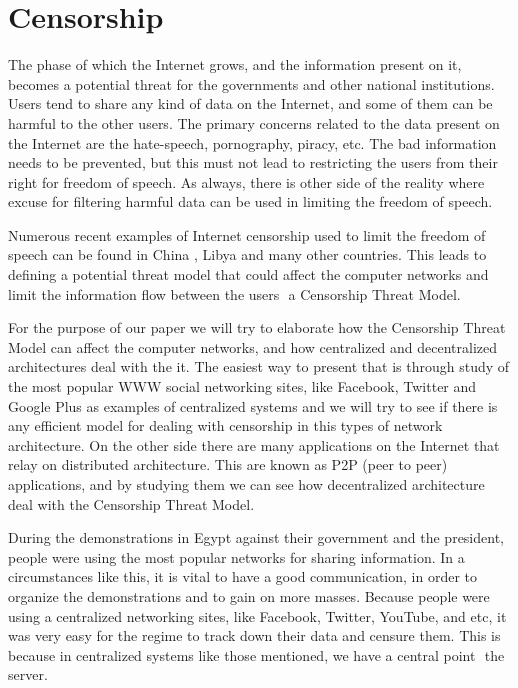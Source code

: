 \section{Censorship}
The phase of which the Internet grows, and the information present on it, becomes a potential threat for the governments and other national institutions. Users tend to share any kind of data on the Internet, and some of them can be harmful to the other users. The primary concerns related to the data present on the Internet are the hate-speech, pornography, piracy, etc. The bad information needs to be prevented, but this must not lead to restricting the users from their right for freedom of speech. As always, there is other side of the reality where excuse for filtering harmful data can be used in limiting the freedom of speech. 

Numerous recent examples of Internet censorship used to limit the freedom of speech can be found in China \cite{canaves}, Libya \cite{dianotti2011}and many other countries. 
This leads to defining a potential threat model that could affect the computer networks and limit the information flow between the users  a Censorship Threat Model.

For the purpose of our paper we will try to elaborate how the Censorship Threat Model can affect the computer networks, and how centralized and decentralized architectures deal with the it. The easiest way to present that is through study of the most popular WWW social networking sites, like Facebook, Twitter and Google Plus as examples of centralized systems and we will try to see if there is any efficient model for dealing with censorship in this types of network architecture. On the other side there are many applications on the Internet that relay on distributed architecture. This are known as P2P (peer to peer) applications, and by studying them we can see how decentralized architecture deal with the Censorship Threat Model.

During the demonstrations in Egypt against their government and the president, people were using the most popular networks for sharing information. In a circumstances like this, it is vital to have a good communication, in order to organize the demonstrations and to gain on more masses. 
Because people were using a centralized networking sites, like Facebook, Twitter, YouTube, and etc, it was very easy for the regime to track down their data and censure them. This is because in centralized systems like those mentioned, we have a central point  the server. 

